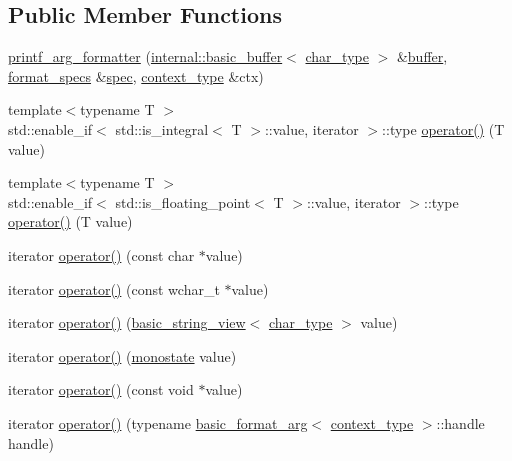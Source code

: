 \subsection*{Public Member Functions}
\begin{DoxyCompactItemize}
\item 
\hyperlink{classprintf__arg__formatter_a776ca166c8295596e9636470e8522f66}{printf\+\_\+arg\+\_\+formatter} (\hyperlink{classinternal_1_1basic__buffer}{internal\+::basic\+\_\+buffer}$<$ \hyperlink{classinternal_1_1arg__formatter__base_a407930bf282880d2ca45dfa8f5d2034b}{char\+\_\+type} $>$ \&\hyperlink{printf_8h_ae986769e0053f875cd11c9fa4d22c8a8}{buffer}, \hyperlink{classinternal_1_1arg__formatter__base_acff46f7da1afa536210eb77a2ea0d775}{format\+\_\+specs} \&\hyperlink{classinternal_1_1arg__formatter__base_aee5efc224d29ce5352d856cbb9afeffa}{spec}, \hyperlink{classbasic__printf__context}{context\+\_\+type} \&ctx)
\item 
{\footnotesize template$<$typename T $>$ }\\std\+::enable\+\_\+if$<$ std\+::is\+\_\+integral$<$ T $>$\+::value, iterator $>$\+::type \hyperlink{classprintf__arg__formatter_adf72c691ec2561e444ac9520cc158243}{operator()} (T value)
\item 
{\footnotesize template$<$typename T $>$ }\\std\+::enable\+\_\+if$<$ std\+::is\+\_\+floating\+\_\+point$<$ T $>$\+::value, iterator $>$\+::type \hyperlink{classprintf__arg__formatter_a5f44717eed332acb0f2a50cfaa6b2efd}{operator()} (T value)
\item 
iterator \hyperlink{classprintf__arg__formatter_a4e462c5b70ceef75a41261472aa56313}{operator()} (const char $\ast$value)
\item 
iterator \hyperlink{classprintf__arg__formatter_a880170cd3e3ace7546cb01268586ac77}{operator()} (const wchar\+\_\+t $\ast$value)
\item 
iterator \hyperlink{classprintf__arg__formatter_a5207b86409ce0aab09db50ae8200097e}{operator()} (\hyperlink{classbasic__string__view}{basic\+\_\+string\+\_\+view}$<$ \hyperlink{classinternal_1_1arg__formatter__base_a407930bf282880d2ca45dfa8f5d2034b}{char\+\_\+type} $>$ value)
\item 
iterator \hyperlink{classprintf__arg__formatter_ae4e5a2115e2770ef22b98b3329a5916a}{operator()} (\hyperlink{structmonostate}{monostate} value)
\item 
iterator \hyperlink{classprintf__arg__formatter_a22c7d349112400ecf9a66005b1a0229e}{operator()} (const void $\ast$value)
\item 
iterator \hyperlink{classprintf__arg__formatter_a57ded50a248eab9775966e05330dfcb5}{operator()} (typename \hyperlink{classbasic__format__arg}{basic\+\_\+format\+\_\+arg}$<$ \hyperlink{classbasic__printf__context}{context\+\_\+type} $>$\+::handle handle)
\end{DoxyCompactItemize}
